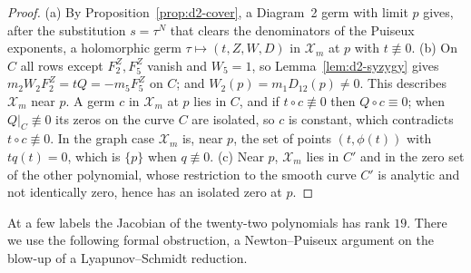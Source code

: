 \begin{proof}
(a) By Proposition~\ref{prop:d2-cover}, a Diagram~2 germ with limit $p$ gives, after the
substitution $s=\tau^N$ that clears the denominators of the Puiseux exponents, a holomorphic germ
$\tau\mapsto(t,Z,W,D)$ in $\mathcal X_m$ at $p$ with $t\not\equiv0$.
(b) On $C$ all rows except $F^Z_2,F^Z_5$ vanish and $W_5=1$, so Lemma~\ref{lem:d2-syzygy} gives
$m_2W_2F^Z_2=tQ=-m_5F^Z_5$ on $C$; and $W_2(p)=m_1D_{12}(p)\ne0$.  This describes $\mathcal X_m$
near $p$.  A germ $c$ in $\mathcal X_m$ at $p$ lies in $C$, and if $t\circ c\not\equiv0$ then
$Q\circ c\equiv0$; when
$Q|_C\not\equiv0$ its zeros on the curve $C$ are isolated, so $c$ is constant, which contradicts
$t\circ c\not\equiv0$.  In the graph case $\mathcal X_m$ is, near $p$, the set of points $(t,\phi(t))$ with
$tq(t)=0$, which is $\{p\}$ when $q\not\equiv0$.
(c) Near $p$, $\mathcal X_m$ lies in $C'$ and in the zero set of the other polynomial, whose restriction
to the smooth curve $C'$ is analytic and not identically zero, hence has an isolated zero at $p$.
\end{proof}

At a few labels the Jacobian of the twenty-two polynomials has rank $19$.  There we use the
following formal obstruction, a Newton--Puiseux argument on the blow-up of a Lyapunov--Schmidt
reduction.

